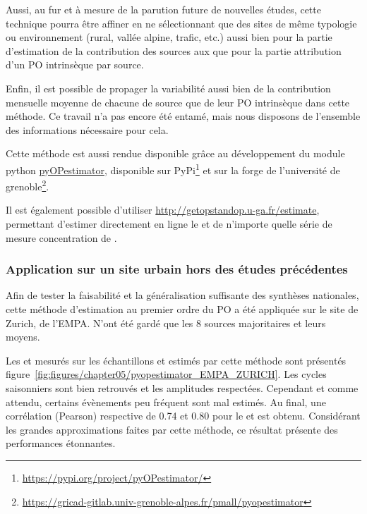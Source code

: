 Aussi, au fur et à mesure de la parution future de nouvelles études, cette technique pourra être 
affiner en ne sélectionnant que des sites de même typologie ou
environnement (rural, vallée alpine, trafic, etc.) aussi bien pour la partie d'estimation
de la contribution des sources aux \PMdix{} que pour la partie attribution d'un PO
intrinsèque par source.

Enfin, il est possible de propager la variabilité aussi bien de la contribution mensuelle
moyenne de chacune de source que de leur PO intrinsèque dans cette méthode. Ce travail n'a
pas encore été entamé, mais nous disposons de l'ensemble des informations nécessaire pour
cela.

\begin{tcolorbox}[colback=red!5!white,colframe=Melon,title=Note]
    Cette méthode est aussi rendue disponible grâce au développement du module python
    \href{https://gricad-gitlab.univ-grenoble-alpes.fr/pmall/pyopestimator}{pyOPestimator},
    disponible sur PyPi\footnote{\url{https://pypi.org/project/pyOPestimator/}} et sur la
    forge de l'université de
    grenoble\footnote{\url{https://gricad-gitlab.univ-grenoble-alpes.fr/pmall/pyopestimator}}.

    Il est également possible d'utiliser \url{http://getopstandop.u-ga.fr/estimate},
    permettant d'estimer directement en ligne le \POAAv{} et \PODTTv{} de n'importe quelle
    série de mesure concentration de \PMdix.
\end{tcolorbox}

\subsubsection{Application sur un site urbain hors des études précédentes}

Afin de tester la faisabilité et la généralisation suffisante des synthèses nationales,
cette méthode d'estimation au premier ordre du PO a été appliquée sur le site de Zurich,
de l'EMPA. N'ont été gardé que les 8 sources majoritaires et leurs \OPm{} moyens.

Les \POAAv{} et \PODTTv{} mesurés sur les échantillons et estimés par cette méthode sont présentés
figure~\ref{fig:figures/chapter05/pyopestimator_EMPA_ZURICH}.
Les cycles saisonniers sont bien retrouvés et les amplitudes respectées. Cependant et
comme attendu, certains évènements peu fréquent sont mal estimés. Au final, une
corrélation (Pearson) respective de 0.74 et 0.80 pour le
\POAAv{} et \PODTTv{} est obtenu.
Considérant les grandes approximations faites par cette méthode, ce résultat présente des
performances étonnantes.

